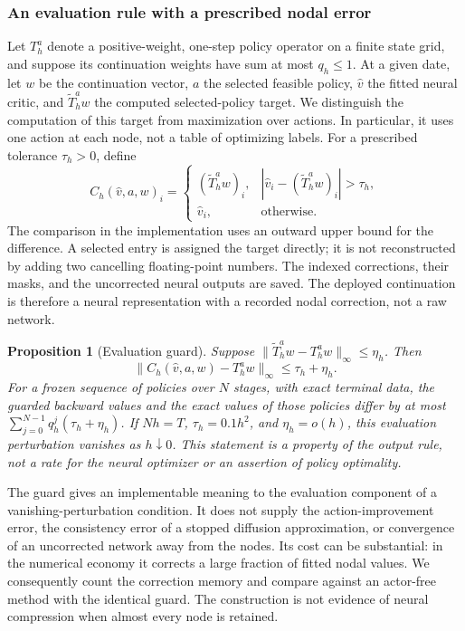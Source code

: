 \documentclass[ecta,nameyear,draft]{econsocart}
\newtheorem{proposition}[theorem]{Proposition}
\theoremstyle{definition}
\theoremstyle{remark}
\begin{document}
\subsubsection{An evaluation rule with a prescribed nodal error}
Let $T_h^a$ denote a positive-weight, one-step policy operator on a finite state grid, and suppose its continuation weights have sum at most $q_h\leq1$. At a given date, let $w$ be the continuation vector, $a$ the selected feasible policy, $\widehat v$ the fitted neural critic, and $\widetilde T_h^a w$ the computed selected-policy target. We distinguish the computation of this target from maximization over actions. In particular, it uses one action at each node, not a table of optimizing labels. For a prescribed tolerance $\tau_h>0$, define
\begin{equation}\label{eq:r9guard}
 C_h(\widehat v,a,w)_i=
 \begin{cases}
  (\widetilde T_h^a w)_i,& |\widehat v_i-(\widetilde T_h^a w)_i|>\tau_h,\\
  \widehat v_i,&\text{otherwise}.
 \end{cases}
\end{equation}
The comparison in the implementation uses an outward upper bound for the difference. A selected entry is assigned the target directly; it is not reconstructed by adding two cancelling floating-point numbers. The indexed corrections, their masks, and the uncorrected neural outputs are saved. The deployed continuation is therefore a neural representation with a recorded nodal correction, not a raw network.

\begin{proposition}[Evaluation guard]\label{prop:r9guard}
Suppose $\|\widetilde T_h^a w-T_h^a w\|_\infty\leq\eta_h$. Then
\[
 \|C_h(\widehat v,a,w)-T_h^a w\|_\infty\leq\tau_h+\eta_h.
\]
For a frozen sequence of policies over $N$ stages, with exact terminal data, the guarded backward values and the exact values of those policies differ by at most $\sum_{j=0}^{N-1}q_h^j(\tau_h+\eta_h)$.
If $N h=T$, $\tau_h=0.1h^2$, and $\eta_h=o(h)$, this evaluation perturbation vanishes as $h\downarrow0$. This statement is a property of the output rule, not a rate for the neural optimizer or an assertion of policy optimality.
\end{proposition}

The guard gives an implementable meaning to the evaluation component of a vanishing-perturbation condition. It does not supply the action-improvement error, the consistency error of a stopped diffusion approximation, or convergence of an uncorrected network away from the nodes. Its cost can be substantial: in the numerical economy it corrects a large fraction of fitted nodal values. We consequently count the correction memory and compare against an actor-free method with the identical guard. The construction is not evidence of neural compression when almost every node is retained.
\end{document}

